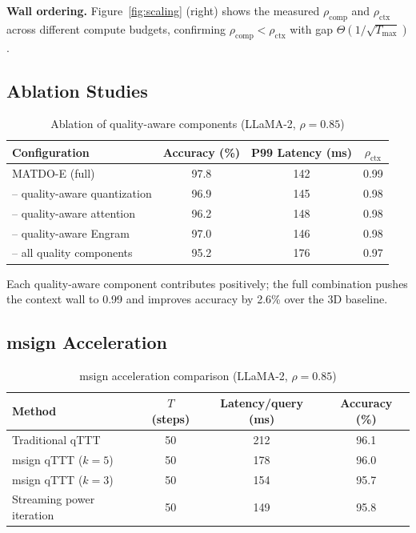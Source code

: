 \documentclass[11pt,a4paper]{article}
\theoremstyle{plain}
\theoremstyle{definition}
\begin{document}
\textbf{Wall ordering.} Figure~\ref{fig:scaling} (right) shows the measured $\rho_{\text{comp}}$ and $\rho_{\text{ctx}}$ across different compute budgets, confirming $\rho_{\text{comp}} < \rho_{\text{ctx}}$ with gap $\Theta(1/\sqrt{T_{\max}})$.

\subsection{Ablation Studies}

\begin{table}[h]
\centering
\caption{Ablation of quality-aware components (LLaMA-2, $\rho=0.85$)}
\label{tab:quality}
\begin{tabular}{@{}lccc@{}}
\toprule
Configuration & Accuracy (\%) & P99 Latency (ms) & $\rho_{\text{ctx}}$ \\
\midrule
MATDO-E (full) & 97.8 & 142 & 0.99 \\
-- quality-aware quantization & 96.9 & 145 & 0.98 \\
-- quality-aware attention & 96.2 & 148 & 0.98 \\
-- quality-aware Engram & 97.0 & 146 & 0.98 \\
-- all quality components & 95.2 & 176 & 0.97 \\
\bottomrule
\end{tabular}
\end{table}

Each quality-aware component contributes positively; the full combination pushes the context wall to 0.99 and improves accuracy by 2.6\% over the 3D baseline.

\subsection{msign Acceleration}

\begin{table}[h]
\centering
\caption{msign acceleration comparison (LLaMA-2, $\rho=0.85$)}
\label{tab:msign}
\begin{tabular}{@{}lccc@{}}
\toprule
Method & $T$ (steps) & Latency/query (ms) & Accuracy (\%) \\
\midrule
Traditional qTTT & 50 & 212 & 96.1 \\
msign qTTT ($k=5$) & 50 & 178 & 96.0 \\
msign qTTT ($k=3$) & 50 & 154 & 95.7 \\
Streaming power iteration & 50 & 149 & 95.8 \\
\bottomrule
\end{tabular}
\end{table}
\end{document}
